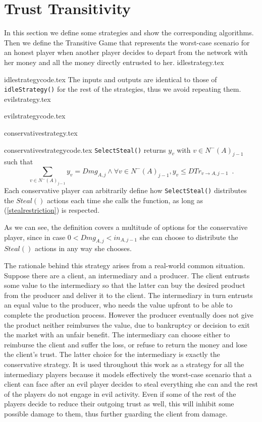 \section{Trust Transitivity}
  In this section we define some strategies and show the corresponding algorithms. Then we define the
  Transitive Game that represents the worst-case scenario for an honest player when another player decides to depart from
  the network with her money and all the money directly entrusted to her.
  {idlestrategy.tex}

  {idlestrategycode.tex}
  The inputs and outputs are identical to those of \texttt{idleStrategy()} for the rest of the strategies, thus we avoid
  repeating them.
  {evilstrategy.tex}

  {evilstrategycode.tex}

  {conservativestrategy.tex}

  {conservativestrategycode.tex}
  \texttt{SelectSteal()} returns $y_v$ with $v \in N^{-}\left(A\right)_{j-1}$ such that
  \begin{equation}
  \label{stealrestriction}
    \sum\limits_{v \in N^{-}\left(A\right)_{j-1}}y_v = Dmg_{A, j} \wedge \forall v \in N^{-}\left(A\right)_{j-1},
    y_v \leq DTr_{v \rightarrow A, j-1} \enspace.
  \end{equation}
  Each conservative player can arbitrarily define how \texttt{SelectSteal()} distributes the $Steal\left(\right)$ actions
  each time she calls the function, as long as (\ref{stealrestriction}) is respected. 

  As we can see, the definition covers a multitude of options for the conservative player, since in case $0 < Dmg_{A,j}
  < in_{A,j-1}$ she can choose to distribute the $Steal\left(\right)$ actions in any way she chooses.

  The rationale behind this strategy arises from a real-world common situation. Suppose there are a client, an
  intermediary and a producer. The client entrusts some value to the intermediary so that the latter can buy the desired
  product from the producer and deliver it to the client. The intermediary in turn entrusts an equal value to the
  producer, who needs the value upfront to be able to complete the production process. However the producer eventually
  does not give the product neither reimburses the value, due to bankruptcy or decision to exit the market with an unfair
  benefit. The intermediary can choose either to reimburse the client and suffer the loss, or refuse to return the money
  and lose the client's trust. The latter choice for the intermediary is exactly the conservative strategy. It is used
  throughout this work as a strategy for all the intermediary players because it models effectively the worst-case
  scenario that a client can face after an evil player decides to steal everything she can and the rest of the players do
  not engage in evil activity. Even if some of the rest of the players decide to reduce their outgoing trust as well, this
  will inhibit some possible damage to them, thus further guarding the client from damage.

